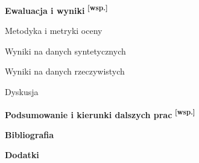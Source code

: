 \documentclass[11pt,a4paper]{article}
\newcommand{\WS}{\textsuperscript{\textbf{[wsp.]}}}
\begin{document}
\begin{toc}
\item \textbf{Ewaluacja i wyniki} \WS
  \begin{toc}
    \item Metodyka i metryki oceny
    \item Wyniki na danych syntetycznych
    \item Wyniki na danych rzeczywistych
    \item Dyskusja
  \end{toc}

\item \textbf{Podsumowanie i kierunki dalszych prac} \WS

\item[] \textbf{Bibliografia}
\item[] \textbf{Dodatki}
\end{toc}
\end{document}
